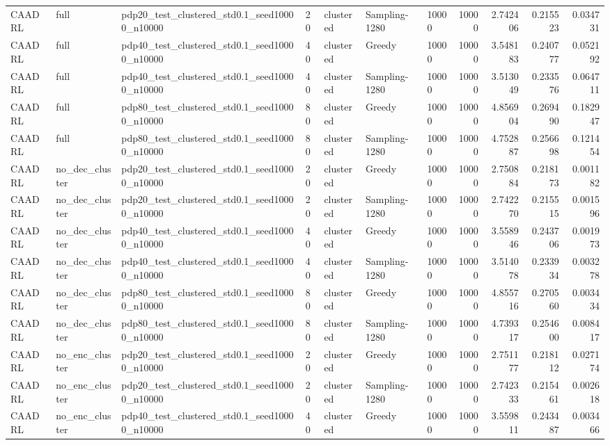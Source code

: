 \begin{tabular}{lllllllrrrr}
CAADRL & full & pdp20_test_clustered_std0.1_seed10000_n10000 & 20 & clustered & Sampling-1280 & 10000 & 10000 & 2.742406 & 0.215523 & 0.034731 \\
CAADRL & full & pdp40_test_clustered_std0.1_seed10000_n10000 & 40 & clustered & Greedy & 10000 & 10000 & 3.548183 & 0.240777 & 0.052192 \\
CAADRL & full & pdp40_test_clustered_std0.1_seed10000_n10000 & 40 & clustered & Sampling-1280 & 10000 & 10000 & 3.513049 & 0.233576 & 0.064711 \\
CAADRL & full & pdp80_test_clustered_std0.1_seed10000_n10000 & 80 & clustered & Greedy & 10000 & 10000 & 4.856904 & 0.269490 & 0.182947 \\
CAADRL & full & pdp80_test_clustered_std0.1_seed10000_n10000 & 80 & clustered & Sampling-1280 & 10000 & 10000 & 4.752887 & 0.256698 & 0.121454 \\
CAADRL & no_dec_cluster & pdp20_test_clustered_std0.1_seed10000_n10000 & 20 & clustered & Greedy & 10000 & 10000 & 2.750884 & 0.218173 & 0.001182 \\
CAADRL & no_dec_cluster & pdp20_test_clustered_std0.1_seed10000_n10000 & 20 & clustered & Sampling-1280 & 10000 & 10000 & 2.742270 & 0.215515 & 0.001596 \\
CAADRL & no_dec_cluster & pdp40_test_clustered_std0.1_seed10000_n10000 & 40 & clustered & Greedy & 10000 & 10000 & 3.558946 & 0.243706 & 0.001973 \\
CAADRL & no_dec_cluster & pdp40_test_clustered_std0.1_seed10000_n10000 & 40 & clustered & Sampling-1280 & 10000 & 10000 & 3.514078 & 0.233934 & 0.003278 \\
CAADRL & no_dec_cluster & pdp80_test_clustered_std0.1_seed10000_n10000 & 80 & clustered & Greedy & 10000 & 10000 & 4.855716 & 0.270560 & 0.003434 \\
CAADRL & no_dec_cluster & pdp80_test_clustered_std0.1_seed10000_n10000 & 80 & clustered & Sampling-1280 & 10000 & 10000 & 4.739317 & 0.254600 & 0.008417 \\
CAADRL & no_enc_cluster & pdp20_test_clustered_std0.1_seed10000_n10000 & 20 & clustered & Greedy & 10000 & 10000 & 2.751177 & 0.218112 & 0.027174 \\
CAADRL & no_enc_cluster & pdp20_test_clustered_std0.1_seed10000_n10000 & 20 & clustered & Sampling-1280 & 10000 & 10000 & 2.742333 & 0.215461 & 0.002618 \\
CAADRL & no_enc_cluster & pdp40_test_clustered_std0.1_seed10000_n10000 & 40 & clustered & Greedy & 10000 & 10000 & 3.559811 & 0.243487 & 0.003466 \\

\end{tabular}
